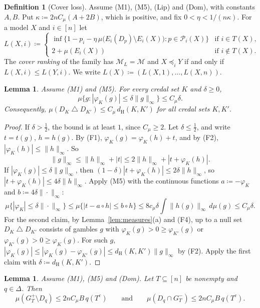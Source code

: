 \documentclass[11pt]{article}
\newtheorem{lemma}[theorem]{Lemma}
\theoremstyle{definition}
\newtheorem{definition}[theorem]{Definition}
\newcommand{\dH}{d_{\mathrm H}}
\newcommand{\Pc}{\mathcal P}
\newcommand{\Mc}{\mathcal M}
\newcommand{\sd}{\mathbin{\triangle}}
\begin{document}
\begin{definition}[Cover loss]\label{def:loss}
Assume (M1), (M5), (Lip) and (Dom), with constants $A,B$. Put $\kappa\coloneqq2nC_\mu(A+2B)$, which is positive, and fix $0<\eta<1/(n\kappa)$. For a model $X$ and $i\in[n]$ let
\[
L(X,i)\coloneqq\begin{cases}
\inf\big\{1-p_i-\eta\,\mu\big(E_i(D_p)\setminus E_i(X)\big):p\in\Pc_i(X)\big\}&\text{if }i\in T(X),\\[2pt]
2+\mu(E_i(X))&\text{if }i\notin T(X).
\end{cases}
\]
The \emph{cover ranking} of the family has $\Mc_L=\Mc$ and $X\preceq_iY$ if and only if $L(X,i)\le L(Y,i)$. We write $L(X)\coloneqq(L(X,1),\dots,L(X,n))$.
\end{definition}

\begin{lemma}\label{lem:thin}
Assume (M1) and (M5). For every credal set $K$ and $\delta\ge0$,
\[
\mu\{g:|\varphi_K(g)|\le\delta\|g\|_\infty\}\le C_\mu\delta.
\]
Consequently, $\mu(D_K\sd D_{K'})\le C_\mu\,\dH(K,K')$ for all credal sets $K,K'$.
\end{lemma}

\begin{proof}
If $\delta>\frac12$, the bound is at least $1$, since $C_\mu\ge2$. Let $\delta\le\frac12$, and write $t=t(g)$, $h=h(g)$. By (F1), $\varphi_K(g)=\varphi_K(h)+t$, and by (F2), $|\varphi_K(h)|\le\|h\|_\infty$. So
\[
\|g\|_\infty\le\|h\|_\infty+|t|\le2\|h\|_\infty+|t+\varphi_K(h)|.
\]
If $|\varphi_K(g)|\le\delta\|g\|_\infty$, then $(1-\delta)|t+\varphi_K(h)|\le2\delta\|h\|_\infty$, so $|t+\varphi_K(h)|\le4\delta\|h\|_\infty$. Apply (M5) with the continuous functions $a\coloneqq-\varphi_K$ and $b\coloneqq4\delta\|\cdot\|_\infty$:
\[
\mu\{|\varphi_K|\le\delta\|\cdot\|_\infty\}\le\mu\{|t-a\circ h|\le b\circ h\}\le8c_\mu\delta\int\|h(g)\|_\infty\,d\mu(g)\le C_\mu\delta.
\]
For the second claim, by Lemma~\ref{lem:measures}(a) and (F4), up to a null set $D_K\sd D_{K'}$ consists of gambles $g$ with $\varphi_K(g)>0\ge\varphi_{K'}(g)$ or $\varphi_{K'}(g)>0\ge\varphi_K(g)$. For such $g$, $|\varphi_K(g)|\le|\varphi_K(g)-\varphi_{K'}(g)|\le\dH(K,K')\|g\|_\infty$ by (F2). Apply the first claim with $\delta\coloneqq\dH(K,K')$.
\end{proof}

\begin{lemma}\label{lem:faces}
Assume (M1), (M5) and (Dom). Let $T\subseteq[n]$ be nonempty and $q\in\Delta$. Then
\[
\mu(G_T^+\setminus D_q)\le2nC_\mu B\,q(T^c)\qquad\text{and}\qquad\mu(D_q\cap G_T^-)\le2nC_\mu B\,q(T^c).
\]
\end{lemma}
\end{document}
